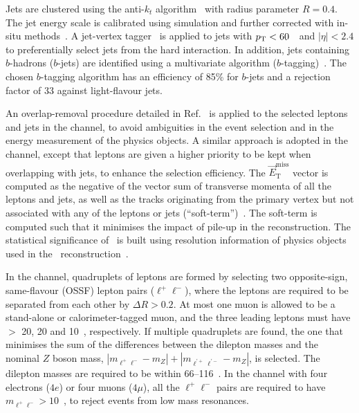 Jets are clustered using the anti-$k_t$ algorithm~\cite{antikt_algorithm,Fastjet} with radius parameter $R = 0.4$. The jet energy scale is calibrated using simulation and further corrected with in-situ methods~\cite{Aaboud:2017jcu}. 
A jet-vertex tagger~\cite{PERF-2014-03} is applied to jets with $p_{\text{T}}<60$~\GeV\ and $|\eta|<2.4$ to preferentially select jets from the hard interaction. In addition, jets containing $b$-hadrons ($b$-jets) are identified using a multivariate algorithm ($b$-tagging)~\cite{bjets}. The chosen $b$-tagging algorithm has an efficiency of 85\%{} for $b$-jets and a rejection factor of 33 against light-flavour jets.

An overlap-removal procedure detailed in Ref.~\cite{Aad:2016eki} is applied to the selected leptons and jets in the \llvvjj channel,
to avoid ambiguities in the event selection and in the energy measurement of the physics objects.
A similar approach is adopted in the \lllljj channel, except that leptons are given a higher priority to be kept when overlapping with jets, to enhance the selection efficiency.
The $\vec{E}_{\mathrm{T}}^{\mathrm{miss}}$ vector is computed as the negative of the vector sum of transverse momenta of all the leptons and jets, as well as the tracks originating from the primary vertex but not associated with any of the leptons or jets (``soft-term'')~\cite{ATL-PHYS-PUB-2015-027}. The soft-term is computed such that it minimises the impact of pile-up in the \met{} reconstruction. The statistical significance of \met~is built using resolution information of physics objects used in the \met~reconstruction~\cite{ATLAS-CONF-2018-038}.

In the \lllljj channel, quadruplets of leptons are formed by selecting two opposite-sign, same-flavour (OSSF) lepton pairs ($\ell^+\ell^-$), where the leptons are required to be separated from each other by $\Delta R >0.2$.
At most one muon is allowed to be a stand-alone or calorimeter-tagged muon, and the three leading leptons must have \pt{} $>$ 20, 20 and 10~\GeV{}, respectively.
If multiple quadruplets are found, the one that minimises the sum of the differences between the dilepton masses and the nominal $Z$ boson mass,
$|m_{\ell^+\ell^-} - m_Z| + |m_{\ell^{'+}\ell^{'-}} - m_Z|$, is selected.
The dilepton masses are required to be within 66--116~\GeV{}.
In the \lllljj channel with four electrons ($4e$) or four muons ($4\mu$), all the $\ell^+\ell^-$ pairs are required to have $m_{\ell^+\ell^-} > 10$~\GeV{},
to reject events from low mass resonances. 

